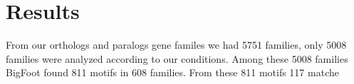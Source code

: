 \section*{Results}

From our orthologs and paralogs gene familes we had 5751 families, only 5008 families were analyzed according to our conditions. Among these 5008 families BigFoot found 811 motifs in 608 families. From these 811 motifs 117 matche
